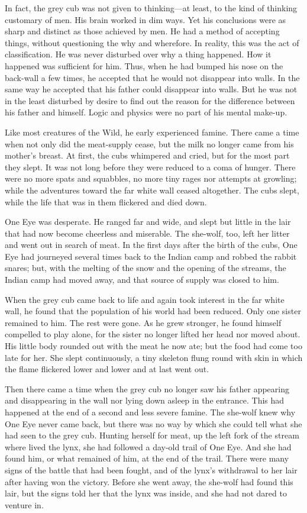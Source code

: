 \documentclass[10pt]{book}
\begin{document}
In fact, the grey cub was not given to thinking—at least, to the kind
of thinking customary of men. His brain worked in dim ways. Yet his
conclusions were as sharp and distinct as those achieved by men. He had
a method of accepting things, without questioning the why and
wherefore. In reality, this was the act of classification. He was never
disturbed over why a thing happened. How it happened was sufficient for
him. Thus, when he had bumped his nose on the back-wall a few times, he
accepted that he would not disappear into walls. In the same way he
accepted that his father could disappear into walls. But he was not in
the least disturbed by desire to find out the reason for the difference
between his father and himself. Logic and physics were no part of his
mental make-up.

Like most creatures of the Wild, he early experienced famine. There
came a time when not only did the meat-supply cease, but the milk no
longer came from his mother’s breast. At first, the cubs whimpered and
cried, but for the most part they slept. It was not long before they
were reduced to a coma of hunger. There were no more spats and
squabbles, no more tiny rages nor attempts at growling; while the
adventures toward the far white wall ceased altogether. The cubs slept,
while the life that was in them flickered and died down.

One Eye was desperate. He ranged far and wide, and slept but little in
the lair that had now become cheerless and miserable. The she-wolf,
too, left her litter and went out in search of meat. In the first days
after the birth of the cubs, One Eye had journeyed several times back
to the Indian camp and robbed the rabbit snares; but, with the melting
of the snow and the opening of the streams, the Indian camp had moved
away, and that source of supply was closed to him.

When the grey cub came back to life and again took interest in the far
white wall, he found that the population of his world had been reduced.
Only one sister remained to him. The rest were gone. As he grew
stronger, he found himself compelled to play alone, for the sister no
longer lifted her head nor moved about. His little body rounded out
with the meat he now ate; but the food had come too late for her. She
slept continuously, a tiny skeleton flung round with skin in which the
flame flickered lower and lower and at last went out.

Then there came a time when the grey cub no longer saw his father
appearing and disappearing in the wall nor lying down asleep in the
entrance. This had happened at the end of a second and less severe
famine. The she-wolf knew why One Eye never came back, but there was no
way by which she could tell what she had seen to the grey cub. Hunting
herself for meat, up the left fork of the stream where lived the lynx,
she had followed a day-old trail of One Eye. And she had found him, or
what remained of him, at the end of the trail. There were many signs of
the battle that had been fought, and of the lynx’s withdrawal to her
lair after having won the victory. Before she went away, the she-wolf
had found this lair, but the signs told her that the lynx was inside,
and she had not dared to venture in.
\end{document}
